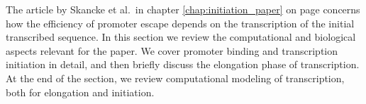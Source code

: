 %
The article by Skancke et al.\ in chapter \ref{chap:initiation_paper} on page
\pageref{chap:initiation_paper} concerns how the efficiency of promoter escape
depends on the transcription of the initial transcribed sequence. In this section we
review the computational and biological aspects relevant for the paper. We
cover promoter binding and transcription initiation in detail, and then briefly
discuss the elongation phase of transcription. At the end of the section, we
review computational modeling of transcription, both for elongation and
initiation.
